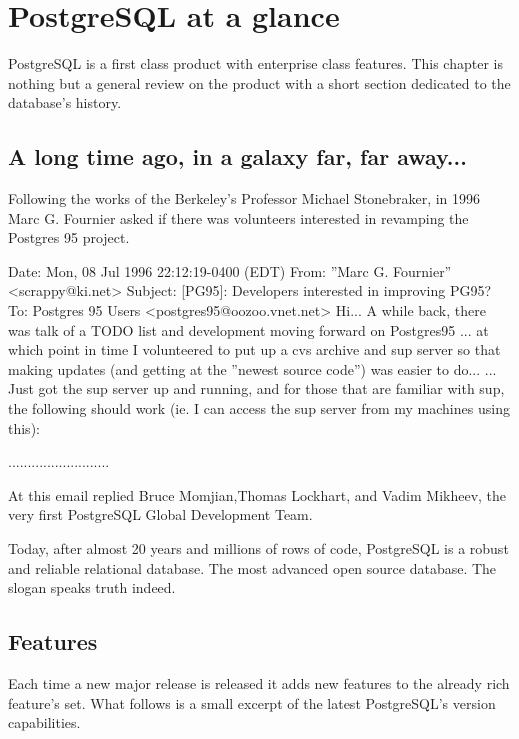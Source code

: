 \chapter{PostgreSQL at a glance}
PostgreSQL is a first class product with enterprise class features.
This chapter is nothing but a general review on the product with a short section dedicated to the 
database's history.

\section{A long time ago, in a galaxy far, far away...}

Following the works of the Berkeley's Professor  Michael Stonebraker, in 1996
Marc G. Fournier asked if there was volunteers interested
in revamping the Postgres 95 project.\newline
\begin{smallverbatim}

Date: Mon, 08 Jul 1996 22:12:19-0400 (EDT) 
From: ”Marc G. Fournier” <scrappy@ki.net>
Subject: [PG95]: Developers interested in improving PG95?
To: Postgres 95 Users <postgres95@oozoo.vnet.net>
Hi... A while back, there was talk of a TODO list and development moving forward on Postgres95 ...
at which point in time I volunteered to put up a cvs archive and sup server so that making updates 
(and getting at the ”newest source code”) was easier to do...
... Just got the sup server up and running, and for those that are familiar with sup, the following 
should work (ie. I can access the sup server from my machines using this): 

..........................
\end{smallverbatim}


At this email replied  Bruce Momjian,Thomas Lockhart, 
and Vadim Mikheev, the very first PostgreSQL Global Development Team.\newline 

Today, after almost 20 years and millions of rows of code, PostgreSQL is a robust and reliable 
relational database. The most advanced open source database. The slogan speaks truth indeed.

\section{Features}
Each time a new major release is released it adds new features to the already 
rich feature's set. What follows is a small excerpt of the latest PostgreSQL's version 
capabilities. 

